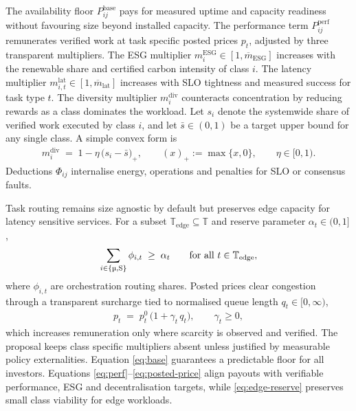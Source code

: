 \documentclass[oneside,10pt]{swissi}
\begin{document}
The availability floor \(P^{\mathrm{base}}_{ij}\) pays for measured uptime and capacity readiness without favouring size beyond installed capacity. The performance term \(P^{\mathrm{perf}}_{ij}\) remunerates verified work at task specific posted prices \(p_t\), adjusted by three transparent multipliers. The ESG multiplier \(m^{\mathrm{ESG}}_{i}\in[1,\overline{m}_{\mathrm{ESG}}]\) increases with the renewable share and certified carbon intensity of class \(i\). The latency multiplier \(m^{\mathrm{lat}}_{i,t}\in[1,\overline{m}_{\mathrm{lat}}]\) increases with SLO tightness and measured success for task type \(t\). The diversity multiplier \(m^{\mathrm{div}}_{i}\) counteracts concentration by reducing rewards as a class dominates the workload. Let \(s_i\) denote the systemwide share of verified work executed by class \(i\), and let \(\bar{s}\in(0,1)\) be a target upper bound for any single class. A simple convex form is
\begin{align}
m^{\mathrm{div}}_{i} \;=\; 1 - \eta\, \big(s_i - \bar{s}\big)_+,\qquad (x)_+ := \max\{x,0\}, \qquad \eta\in[0,1). \label{eq:diversity}
\end{align}
Deductions \(\Phi_{ij}\) internalise energy, operations and penalties for SLO or consensus faults.

Task routing remains size agnostic by default but preserves edge capacity for latency sensitive services. For a subset \(\mathbb{T}_{\mathrm{edge}}\subseteq\mathbb{T}\) and reserve parameter \(\alpha_t\in(0,1]\),
\begin{align}
\sum_{i\in\{\text{\textmu},\mathrm{S}\}} \phi_{i,t} \;\ge\; \alpha_t \qquad \text{for all } t\in\mathbb{T}_{\mathrm{edge}}, \label{eq:edge-reserve}
\end{align}
where \(\phi_{i,t}\) are orchestration routing shares. Posted prices clear congestion through a transparent surcharge tied to normalised queue length \(q_t\in[0,\infty)\),
\begin{align}
p_t \;=\; p_t^{0}\,\big(1 + \gamma_t\, q_t\big), \qquad \gamma_t \ge 0, \label{eq:posted-price}
\end{align}
which increases remuneration only where scarcity is observed and verified. The proposal keeps class specific multipliers absent unless justified by measurable policy externalities. Equation \eqref{eq:base} guarantees a predictable floor for all investors. Equations \eqref{eq:perf}–\eqref{eq:posted-price} align payouts with verifiable performance, ESG and decentralisation targets, while \eqref{eq:edge-reserve} preserves small class viability for edge workloads.
\end{document}
